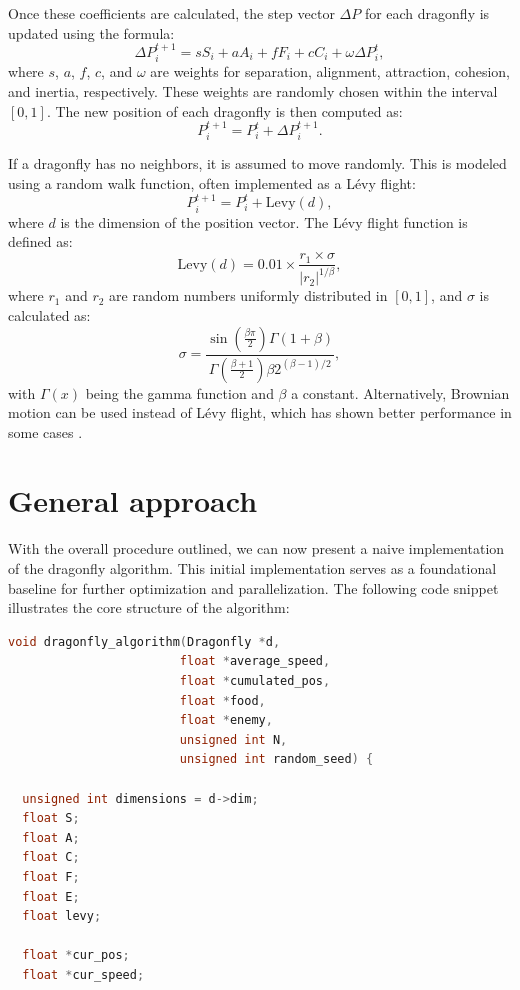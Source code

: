\documentclass[10pt]{article}
\begin{document}
\begin{multicols}{2}
\noindent Once these coefficients are calculated, the step vector $\Delta P$ for each dragonfly is updated using the formula:
$$\Delta P_i^{t+1} = sS_i + aA_i + fF_i + cC_i + \omega \Delta P_i^t,$$
where $s$, $a$, $f$, $c$, and $\omega$ are weights for separation, alignment, attraction, cohesion, and inertia, respectively. These weights are randomly chosen within the interval $[0,1]$. The new position of each dragonfly is then computed as:
$$P_i^{t+1} = P_i^t + \Delta P_i^{t+1}.$$

If a dragonfly has no neighbors, it is assumed to move randomly. This is modeled using a random walk function, often implemented as a Lévy flight:
$$P_i^{t+1} = P_i^t + \mathrm{Levy}(d),$$
where $d$ is the dimension of the position vector. The Lévy flight function is defined as:
$$\mathrm{Levy}(d) = 0.01 \times \frac{r_1 \times \sigma}{|r_2|^{1/\beta}},$$
where $r_1$ and $r_2$ are random numbers uniformly distributed in $[0,1]$, and $\sigma$ is calculated as:
$$\sigma = \frac{\sin\left(\frac{\beta \pi}{2}\right) \Gamma(1+\beta)}{\Gamma\left(\frac{\beta+1}{2}\right) \beta 2^{(\beta-1)/2}},$$
with $\Gamma(x)$ being the gamma function and $\beta$ a constant. Alternatively, Brownian motion can be used instead of Lévy flight, which has shown better performance in some cases \cite{BDragonfly}.



\section{General approach}
With the overall procedure outlined, we can now present a naive implementation of the dragonfly algorithm. This initial implementation serves as a foundational baseline for further optimization and parallelization. The following code snippet illustrates the core structure of the algorithm:

\begin{lstlisting}[language=C,caption={first implementation of the dragonfly algorithm}]
void dragonfly_algorithm(Dragonfly *d, 
                        float *average_speed,
                        float *cumulated_pos, 
                        float *food, 
                        float *enemy,
                        unsigned int N, 
                        unsigned int random_seed) {

  unsigned int dimensions = d->dim;
  float S;
  float A;
  float C;
  float F;
  float E;
  float levy;

  float *cur_pos;
  float *cur_speed;


\end{lstlisting}
\end{multicols}
\end{document}
